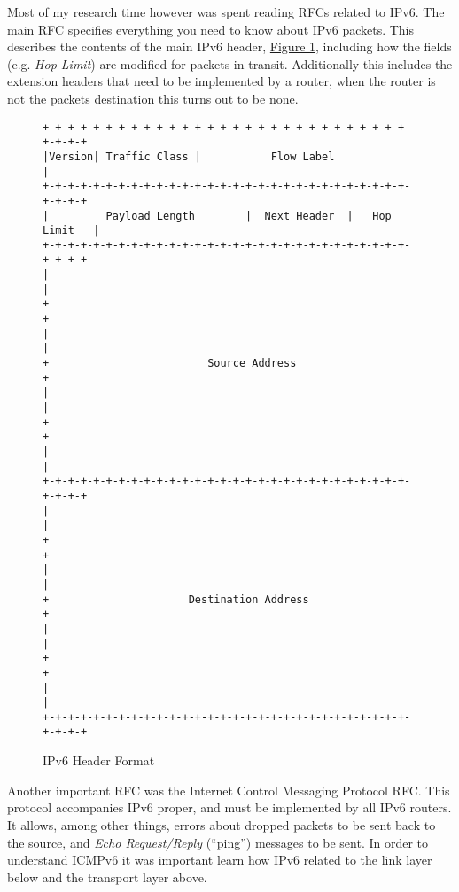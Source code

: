 \documentclass[12pt,a4paper,twoside,openright]{report}
\begin{document}
\bigskip

Most of my research time however was spent reading RFCs related to IPv6.  The main RFC\cite{ipv6_rfc} specifies everything you need to know about IPv6 packets. This describes the contents of the main IPv6 header, \hyperref[fig::ipv6_header]{Figure }\ref{fig::ipv6_header}, including how the fields (e.g. \textit{Hop Limit}) are modified for packets in transit. Additionally this includes the extension headers that need to be implemented by a router, when the router is not the packets destination this turns out to be none. 

\begin{figure}
\centering
\begin{varwidth}{\linewidth}
\begin{verbatim}
+-+-+-+-+-+-+-+-+-+-+-+-+-+-+-+-+-+-+-+-+-+-+-+-+-+-+-+-+-+-+-+-+
|Version| Traffic Class |           Flow Label                  |
+-+-+-+-+-+-+-+-+-+-+-+-+-+-+-+-+-+-+-+-+-+-+-+-+-+-+-+-+-+-+-+-+
|         Payload Length        |  Next Header  |   Hop Limit   |
+-+-+-+-+-+-+-+-+-+-+-+-+-+-+-+-+-+-+-+-+-+-+-+-+-+-+-+-+-+-+-+-+
|                                                               |
+                                                               +
|                                                               |
+                         Source Address                        +
|                                                               |
+                                                               +
|                                                               |
+-+-+-+-+-+-+-+-+-+-+-+-+-+-+-+-+-+-+-+-+-+-+-+-+-+-+-+-+-+-+-+-+
|                                                               |
+                                                               +
|                                                               |
+                      Destination Address                      +
|                                                               |
+                                                               +
|                                                               |
+-+-+-+-+-+-+-+-+-+-+-+-+-+-+-+-+-+-+-+-+-+-+-+-+-+-+-+-+-+-+-+-+
\end{verbatim}
\end{varwidth}
\caption{IPv6 Header Format\cite{ipv6_rfc}}
\label{fig::ipv6_header}
\end{figure}

\bigskip

Another important RFC was the Internet Control Messaging Protocol RFC\cite{icmpv6_rfc}.  This protocol accompanies IPv6 proper, and must be implemented by all IPv6 routers.  It allows, among other things, errors about dropped packets to be sent back to the source, and \textit{Echo Request/Reply} (``ping'') messages to be sent.  In order to understand ICMPv6 it was important learn how IPv6 related to the link layer below and the transport layer above.
\end{document}

